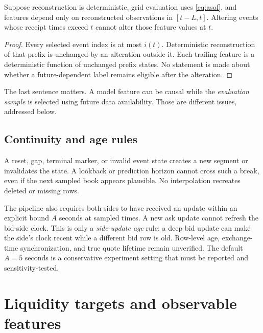 \begin{proposition}
Suppose reconstruction is deterministic, grid evaluation uses \eqref{eq:asof}, and features depend only on reconstructed observations in $[t-L,t]$. Altering events whose receipt times exceed $t$ cannot alter those feature values at $t$.
\end{proposition}
\begin{proof}
Every selected event index is at most $i(t)$. Deterministic reconstruction of that prefix is unchanged by an alteration outside it. Each trailing feature is a deterministic function of unchanged prefix states. No statement is made about whether a future-dependent label remains eligible after the alteration.
\end{proof}

The last sentence matters. A model feature can be causal while the \emph{evaluation sample} is selected using future data availability. Those are different issues, addressed below.

\subsection{Continuity and age rules}
A reset, gap, terminal marker, or invalid event state creates a new segment or invalidates the state. A lookback or prediction horizon cannot cross such a break, even if the next sampled book appears plausible. No interpolation recreates deleted or missing rows.

The pipeline also requires both sides to have received an update within an explicit bound $A$ seconds at sampled times. A new ask update cannot refresh the bid-side clock. This is only a \emph{side-update age} rule: a deep bid update can make the side's clock recent while a different bid row is old. Row-level age, exchange-time synchronization, and true quote lifetime remain unverified. The default $A=5$ seconds is a conservative experiment setting that must be reported and sensitivity-tested.

\section{Liquidity targets and observable features}
